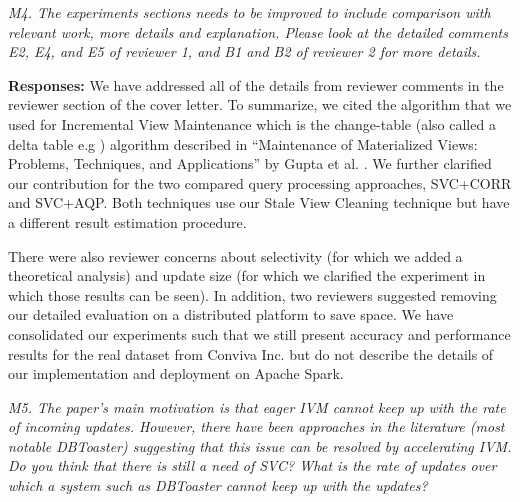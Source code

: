 \vspace{1em}
\emph{M4. The experiments sections needs to be improved to include comparison with relevant work, more details and explanation. Please look at the detailed comments E2, E4, and E5 of reviewer 1, and B1 and B2 of reviewer 2 for more details. }

\vspace{.25em}

{\bf Responses:} We have addressed all of the details from reviewer comments in the reviewer section of the cover letter. To summarize, we cited the algorithm that we used for Incremental View Maintenance which is the change-table (also called a delta table e.g \cite{DBLP:journals/vldb/KochAKNNLS14}) algorithm described in “Maintenance of Materialized Views: Problems, Techniques, and Applications” by Gupta et al. \cite{gupta1995maintenance, gupta2006incremental}. 
We further clarified our contribution for the two compared query processing approaches, SVC+CORR and SVC+AQP. Both techniques use our Stale View Cleaning technique but have a different result estimation procedure. 

There were also reviewer concerns about selectivity (for which we added a theoretical analysis) and update size (for which we clarified the experiment in which those results can be seen).
In addition, two reviewers suggested removing our detailed evaluation on a distributed platform to save space. We have consolidated our experiments such that we still present accuracy and performance results for the real dataset from Conviva Inc. but do not describe the details of our implementation and deployment on Apache Spark.

\vspace{1em}
\emph{M5. The paper's main motivation is that eager IVM cannot keep up with the rate of incoming updates. However, there have been approaches in the literature (most notable DBToaster) suggesting that this issue can be resolved by accelerating IVM. Do you think that there is still a need of SVC? What is the rate of updates over which a system such as DBToaster cannot keep up with the updates?}

\vspace{.25em}

